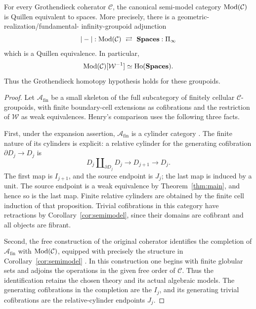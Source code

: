 \begin{corollary}\label{cor:homotopy-hypothesis}
For every Grothendieck coherator \(\mathcal C\), the canonical
semi-model category \(\operatorname{Mod}(\mathcal C)\) is Quillen equivalent to
spaces.  More precisely, there is a geometric-realization/fundamental-
infinity-groupoid adjunction
\[
 |-|:\Mod(\mathcal C)\ \rightleftarrows\ \Spaces:\Pi_\infty
\]
which is a Quillen equivalence.  In particular,
\[
 \operatorname{Mod}(\mathcal C)[\mathcal W^{-1}]
       \simeq \operatorname{Ho}(\mathbf{Spaces}).
\]
Thus the Grothendieck homotopy hypothesis holds for these groupoids.
\end{corollary}

\begin{proof}
Let \(\mathcal A_{\mathrm{fin}}\) be a small skeleton of the full
subcategory of finitely cellular \(\mathcal C\)-groupoids, with finite boundary-cell
extensions as cofibrations and the restriction of \(\mathcal W\)
as weak equivalences.  Henry's comparison uses the following three
facts.

First, under the expansion assertion, \(\mathcal A_{\mathrm{fin}}\)
is a cylinder category
\cite[Proposition~5.3.6]{Henry2016}.  The finite nature of its
cylinders is explicit: a relative cylinder for the generating
cofibration \(\partial D_j\to D_j\) is
\[
 D_j\amalg_{\partial D_j}D_j
       \longrightarrow D_{j+1}\longrightarrow D_j.
\]
The first map is \(I_{j+1}\), and the source endpoint is \(J_j\);
the last map is induced by a unit.  The source endpoint is a weak
equivalence by Theorem~\ref{thm:main}, and hence so is the last map.
Finite relative cylinders are obtained by the finite cell induction
of that proposition.  Trivial cofibrations in this category have
retractions by Corollary~\ref{cor:semimodel}, since their domains are
cofibrant and all objects are fibrant.

Second, the free construction of the original coherator identifies
the completion of \(\mathcal A_{\mathrm{fin}}\) with
\(\operatorname{Mod}(\mathcal C)\), equipped with precisely the structure in
Corollary~\ref{cor:semimodel}
\cite[Proposition~5.3.7]{Henry2016}.  In this construction one begins
with finite globular sets and adjoins the operations in the given
free order of \(\mathcal C\).  Thus the identification retains the
chosen theory and its actual algebraic models.  The generating
cofibrations in the completion are the \(I_j\), and its generating
trivial cofibrations are the relative-cylinder endpoints \(J_j\).


\end{proof}
